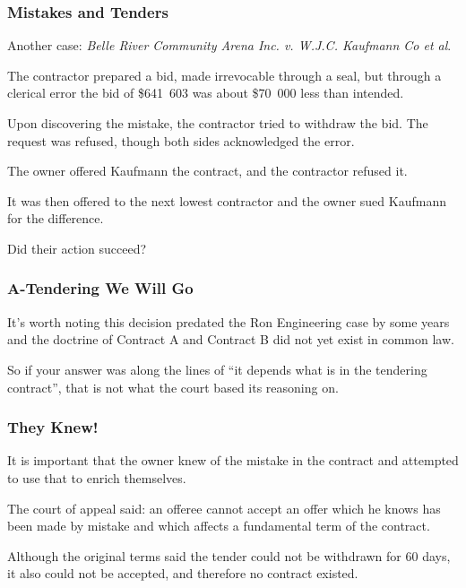 \begin{frame}
\frametitle{Mistakes and Tenders}

Another case: \textit{Belle River Community Arena Inc. v. W.J.C. Kaufmann Co et al}.

The contractor prepared a bid, made irrevocable through a seal, but through a clerical error the bid of \$641~603 was about \$70~000 less than intended.

Upon discovering the mistake, the contractor tried to withdraw the bid. The request was refused, though both sides acknowledged the error.

The owner offered Kaufmann the contract, and the contractor refused it.

It was then offered to the next lowest contractor and the owner sued Kaufmann for the difference.

Did their action succeed?

\end{frame}



\begin{frame}
\frametitle{A-Tendering We Will Go}

It's worth noting this decision predated the Ron Engineering case by some years and the doctrine of Contract A and Contract B did not yet exist in common law.

So if your answer was along the lines of ``it depends what is in the tendering contract'', that is not what the court based its reasoning on.

\end{frame}



\begin{frame}
\frametitle{They Knew!}

It is important that the owner knew of the mistake in the contract and attempted to use that to enrich themselves.

The court of appeal said: an offeree cannot accept an offer which he knows has been made by mistake and which affects a fundamental term of the contract.

Although the original terms said the tender could not be withdrawn for 60 days, it also could not be accepted, and therefore no contract existed.


\end{frame}





